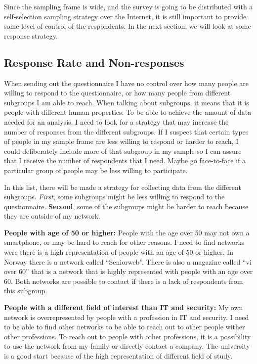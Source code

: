     Since the sampling frame is wide, and the survey is going to be distributed with a self-selection sampling strategy over the Internet, it is still important to provide some level of control of the respondents. In the next section, we will look at some response strategy.

    \subsection{Response Rate and Non-responses} \label{sec:response}

    When sending out the questionnaire I have no control over how many people are willing to respond to the questionnaire, or how many people from different subgroups I am able to reach. When talking about subgroups, it means that it is people with different human properties. To be able to achieve the amount of data needed for an analysis, I need to look for a strategy that may increase the number of responses from the different subgroups. If I suspect that certain types of people in my sample frame are less willing to respond or harder to reach, I could deliberately include more of that subgroup in my sample so I can assure that I receive the number of respondents that I need. Maybe go face-to-face if a particular group of people may be less willing to participate. 

    In this list, there will be made a strategy for collecting data from the different subgroups. {\it First}, some subgroups might be less willing to respond to the questionnaire. {\bf Second}, some of the subgroups might be harder to reach because they are outside of my network. 

    {\bf People with age of 50 or higher:} People with the age over 50 may not own a smartphone, or may be hard to reach for other reasons. I need to find networks were there is a high representation of people with an age of 50 or higher. In Norway there is a network called ``Seniorweb''. There is also a magazine called ``vi over 60'' that is a network that is highly represented with people with an age over 60. Both networks are possible to contact if there is a lack of respondents from this subgroup. 

    {\bf People with a different field of interest than IT and security:} My own network is overrepresented by people with a profession in IT and security. I need to be able to find other networks to be able to reach out to other people wither other professions. To reach out to people with other professions, it is a possibility to use the network from my family or directly contact a company. The university is a good start because of the high representation of different field of study. 
    
